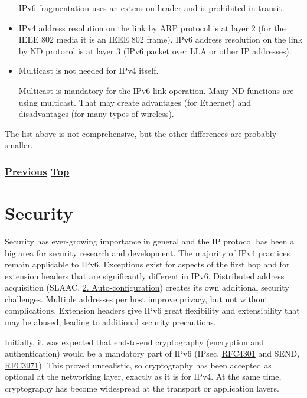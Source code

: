 \documentclass[
]{article}
\begin{document}
\begin{itemize}
  IPv6 fragmentation uses an extension header and is prohibited in
  transit.
\item
  IPv4 address resolution on the link by ARP protocol is at layer 2 (for
  the IEEE 802 media it is an IEEE 802 frame). IPv6 address resolution
  on the link by ND protocol is at layer 3 (IPv6 packet over LLA or
  other IP addresses).
\item
  Multicast is not needed for IPv4 itself.

  Multicast is mandatory for the IPv6 link operation. Many ND functions
  are using multicast. That may create advantages (for Ethernet) and
  disadvantages (for many types of wireless).
\end{itemize}

The list above is not comprehensive, but the other differences are
probably smaller.

\subsubsection{\texorpdfstring{\hyperref[obsolete-techniques]{Previous}
\hyperref[coexistence-with-legacy-ipv4]{Top}}{Previous Top}}\label{previous-top-2}

\pagebreak

\section{Security}\label{security}

Security has ever-growing importance in general and the IP protocol has
been a big area for security research and development. The majority of
IPv4 practices remain applicable to IPv6. Exceptions exist for aspects
of the first hop and for extension headers that are significantly
different in IPv6. Distributed address acquisition (SLAAC,
\hyperref[auto-configuration]{2. Auto-configuration}) creates its own
additional security challenges. Multiple addresses per host improve
privacy, but not without complications. Extension headers give IPv6
great flexibility and extensibility that may be abused, leading to
additional security precautions.

Initially, it was expected that end-to-end cryptography (encryption and
authentication) would be a mandatory part of IPv6 (IPsec,
\href{https://www.rfc-editor.org/info/rfc4301}{RFC4301} and SEND,
\href{https://www.rfc-editor.org/info/rfc3971}{RFC3971}). This proved
unrealistic, so cryptography has been accepted as optional at the
networking layer, exactly as it is for IPv4. At the same time,
cryptography has become widespread at the transport or application
layers.
\end{document}
